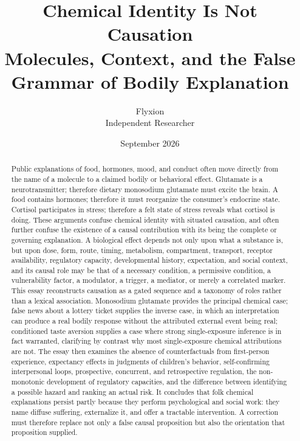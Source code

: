 \documentclass[11pt]{article}
\title{\textbf{Chemical Identity Is Not Causation}\\[0.4em]
\large Molecules, Context, and the False Grammar of Bodily Explanation}
\author{Flyxion\\\small Independent Researcher}
\date{September 2026}
\begin{document}
\maketitle

\begin{abstract}
Public explanations of food, hormones, mood, and conduct often move directly from the name of a molecule to a claimed bodily or behavioral effect. Glutamate is a neurotransmitter; therefore dietary monosodium glutamate must excite the brain. A food contains hormones; therefore it must reorganize the consumer's endocrine state. Cortisol participates in stress; therefore a felt state of stress reveals what cortisol is doing. These arguments confuse chemical identity with situated causation, and often further confuse the existence of a causal contribution with its being the complete or governing explanation. A biological effect depends not only upon what a substance is, but upon dose, form, route, timing, metabolism, compartment, transport, receptor availability, regulatory capacity, developmental history, expectation, and social context, and its causal role may be that of a necessary condition, a permissive condition, a vulnerability factor, a modulator, a trigger, a mediator, or merely a correlated marker. This essay reconstructs causation as a gated sequence and a taxonomy of roles rather than a lexical association. Monosodium glutamate provides the principal chemical case; false news about a lottery ticket supplies the inverse case, in which an interpretation can produce a real bodily response without the attributed external event being real; conditioned taste aversion supplies a case where strong single-exposure inference is in fact warranted, clarifying by contrast why most single-exposure chemical attributions are not. The essay then examines the absence of counterfactuals from first-person experience, expectancy effects in judgments of children's behavior, self-confirming interpersonal loops, prospective, concurrent, and retrospective regulation, the non-monotonic development of regulatory capacities, and the difference between identifying a possible hazard and ranking an actual risk. It concludes that folk chemical explanations persist partly because they perform psychological and social work: they name diffuse suffering, externalize it, and offer a tractable intervention. A correction must therefore replace not only a false causal proposition but also the orientation that proposition supplied.
\end{abstract}
\newpage
\end{document}
